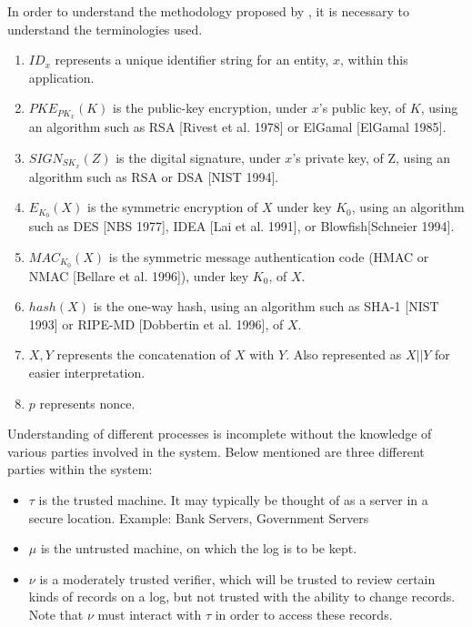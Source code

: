 \documentclass[12pt, letter]{article}
\newcommand\paperAuthors[2]{[#1 and #2]}
\newcommand\makePaperAuthors{\paperAuthors{Bruce Schneier}{John Kelsey}}
\begin{document}
In order to understand the methodology proposed by \text{\makePaperAuthors}, it is necessary to understand the terminologies used.
\renewcommand{\labelenumi}{(\roman{enumi})}
\begin{enumerate}
    \item $ID_x$ represents a unique identifier string for an entity, $x$, within this application. 
    
    \item $PKE_{PK_x} (K)$ is the public-key encryption, under $x$’s public key, of $K$, using an algorithm such as RSA [Rivest et al. 1978] or ElGamal [ElGamal 1985].

    \item $SIGN_{SK_x}(Z)$ is the digital signature, under $x$’s private key, of Z, using an algorithm such as RSA or DSA [NIST 1994].

    \item $E_{K_0}(X)$ is the symmetric encryption of $X$ under key $K_0$, using an algorithm such as DES [NBS 1977], IDEA [Lai et al. 1991], or Blowfish[Schneier 1994]. 

    \item $MAC_{K_0}(X)$ is the symmetric message authentication code (HMAC or NMAC [Bellare et al. 1996]), under key $K_0$, of $X$. 

    \item $hash(X)$ is the one-way hash, using an algorithm such as SHA-1 [NIST 1993] or RIPE-MD [Dobbertin et al. 1996], of $X$. 

    \item $X, Y$ represents the concatenation of $X$ with $Y$. Also represented as $X || Y$ for easier interpretation.

    \item $p$ represents nonce.
\end{enumerate}

Understanding of different processes is incomplete without the knowledge of various parties involved in the system. Below mentioned are three different parties within the system:

\begin{itemize}
    \item $\tau$ is the trusted machine. It may typically be thought of as a server in a secure location. Example: Bank Servers, Government Servers
    
    \item $\mu$ is the untrusted machine, on which the log is to be kept.
    
    \item $\nu$ is a moderately trusted verifier, which will be trusted to review certain kinds of records on a log, but not trusted with the ability to change records. Note that $\nu$ must interact with $\tau$ in order to access these records. 
\end{itemize}
\end{document}
